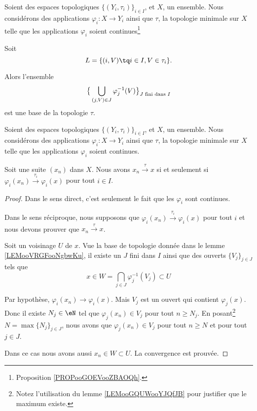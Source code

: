 \begin{lemma}     \label{LEMooVRGFooNgbwKu}
    Soient des espaces topologiques \( \{ (Y_i,\tau_i) \}_{i\in I}\), et \( X\), un ensemble. Nous considérons des applications \( \varphi_i\colon X\to Y_i\) ainsi que \( \tau\), la topologie minimale sur \( X\) telle que les applications \( \varphi_i\) soient continues\footnote{Proposition \ref{PROPooGOEVooZBAOQh}.}

    Soit
    \begin{equation}
        L=\{ (i,V)\tq i\in I,V\in \tau_i \}.
    \end{equation}
    
    Alors l'ensemble
    \begin{equation}
        \big\{ \bigcup_{(j,V)\in J}\varphi_j^{-1}(V) \big\}_{\text{\( J\) fini dans \( I\)}}
    \end{equation}
    est une base de la topologie \( \tau\).
\end{lemma}

\begin{lemma}     \label{LEMooADPLooYylNsj}
    Soient des espaces topologiques \( \{ (Y_i,\tau_i) \}_{i\in I}\), et \( X\), un ensemble. Nous considérons des applications \( \varphi_i\colon X\to Y_i\) ainsi que \( \tau\), la topologie minimale sur \( X\) telle que les applications \( \varphi_i\) soient continues.

    Soit une suite \( (x_n)\) dans \( X\). Nous avons \( x_n\stackrel{\tau}{\longrightarrow}x\) si et seulement si \( \varphi_i(x_n)\stackrel{\tau_i}{\longrightarrow}\varphi_i(x)\) pour tout \( i\in I\).
\end{lemma}

\begin{proof}
    Dans le sens direct, c'est seulement le fait que les \( \varphi_i\) sont continues.

    Dans le sens réciproque, nous supposons que \( \varphi_i(x_n)\stackrel{\tau_i}{\longrightarrow}\varphi_i(x)\) pour tout \( i\) et nous devons prouver que \( x_n\stackrel{\tau}{\longrightarrow}x\).

    Soit un voisinage \( U\) de \( x\). Vue la base de topologie donnée dans le lemme \ref{LEMooVRGFooNgbwKu}, il existe un \( J\) fini dans \( I\) ainsi que des ouverts \( \{ V_j \}_{j\in J}\) tels que 
    \begin{equation}
        x\in W=\bigcap_{j\in J}\varphi_j^{-1}(V_j)\subset U
    \end{equation}

    Par hypothèse, \( \varphi_i(x_n)\to\varphi_i(x)\). Mais \( V_j\) est un ouvert qui contient \( \varphi_j(x)\). Donc il existe \( N_j\in \eN\) tel que \( \varphi_j(x_n)\in V_j\) pour tout \( n\geq N_j\). En posant\footnote{Notez l'utilisation du lemme \ref{LEMooGQUWooYJQfJB} pour justifier que le maximum existe.} \( N=\max\{ N_j \}_{j\in J}\), nous avons que \( \varphi_j(x_n)\in V_j\) pour tout \( n\geq N\) et pour tout \( j\in J\).

    Dans ce cas nous avons aussi \( x_n\in W\subset U\). La convergence est prouvée.
\end{proof}

